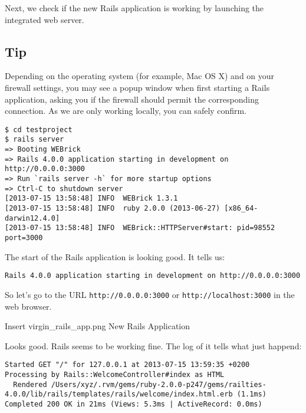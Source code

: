 \documentclass[a4paper]{book}
\begin{document}
Next, we check if the new Rails application is working by launching the integrated web server.

\subsection{Tip}\label{tip-2}

Depending on the operating system (for example, Mac OS X) and on your firewall settings, you may see a popup window when first starting a Rails application, asking you if the firewall should permit the corresponding connection. As we are only working locally, you can safely confirm.

\begin{shaded}\begin{verbatim}
$ cd testproject
$ rails server
=> Booting WEBrick
=> Rails 4.0.0 application starting in development on http://0.0.0.0:3000
=> Run `rails server -h` for more startup options
=> Ctrl-C to shutdown server
[2013-07-15 13:58:48] INFO  WEBrick 1.3.1
[2013-07-15 13:58:48] INFO  ruby 2.0.0 (2013-06-27) [x86_64-darwin12.4.0]
[2013-07-15 13:58:48] INFO  WEBrick::HTTPServer#start: pid=98552 port=3000
\end{verbatim}\end{shaded}

The start of the Rails application is looking good. It tells us:

\begin{shaded}\begin{verbatim}
Rails 4.0.0 application starting in development on http://0.0.0.0:3000
\end{verbatim}\end{shaded}

So let's go to the URL \texttt{http://0.0.0.0:3000} or \texttt{http://localhost:3000} in the web browser.

Insert virgin\_rails\_app.png New Rails Application

Looks good. Rails seems to be working fine. The log of it tells what just happend:

\begin{shaded}\begin{verbatim}
Started GET "/" for 127.0.0.1 at 2013-07-15 13:59:35 +0200
Processing by Rails::WelcomeController#index as HTML
  Rendered /Users/xyz/.rvm/gems/ruby-2.0.0-p247/gems/railties-4.0.0/lib/rails/templates/rails/welcome/index.html.erb (1.1ms)
Completed 200 OK in 21ms (Views: 5.3ms | ActiveRecord: 0.0ms)
\end{verbatim}\end{shaded}
\end{document}
